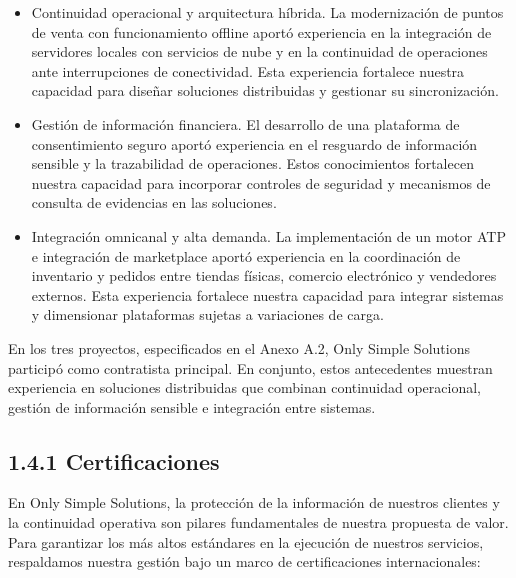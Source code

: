 \documentclass[11pt]{article}
\providecommand{\tightlist}{%
  \setlength{\itemsep}{0pt}\setlength{\parskip}{0pt}}
\begin{document}
\begin{itemize}
\tightlist
\item
  Continuidad operacional y arquitectura híbrida. La modernización de puntos de venta con funcionamiento offline aportó experiencia en la integración de servidores locales con servicios de nube y en la continuidad de operaciones ante interrupciones de conectividad. Esta experiencia fortalece nuestra capacidad para diseñar soluciones distribuidas y gestionar su sincronización.
\item
  Gestión de información financiera. El desarrollo de una plataforma de consentimiento seguro aportó experiencia en el resguardo de información sensible y la trazabilidad de operaciones. Estos conocimientos fortalecen nuestra capacidad para incorporar controles de seguridad y mecanismos de consulta de evidencias en las soluciones.
\item
  Integración omnicanal y alta demanda. La implementación de un motor ATP e integración de marketplace aportó experiencia en la coordinación de inventario y pedidos entre tiendas físicas, comercio electrónico y vendedores externos. Esta experiencia fortalece nuestra capacidad para integrar sistemas y dimensionar plataformas sujetas a variaciones de carga.
\end{itemize}

En los tres proyectos, especificados en el Anexo A.2, Only Simple Solutions participó como contratista principal. En conjunto, estos antecedentes muestran experiencia en soluciones distribuidas que combinan continuidad operacional, gestión de información sensible e integración entre sistemas.

\subsection{1.4.1 Certificaciones}\label{certificaciones}

En Only Simple Solutions, la protección de la información de nuestros clientes y la continuidad operativa son pilares fundamentales de nuestra propuesta de valor. Para garantizar los más altos estándares en la ejecución de nuestros servicios, respaldamos nuestra gestión bajo un marco de certificaciones internacionales:
\end{document}
